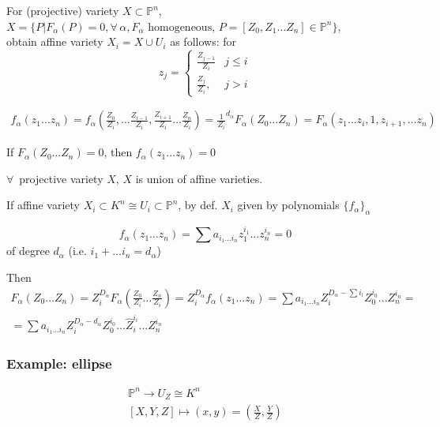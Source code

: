 \documentclass[10pt]{amsart}
\begin{document}
\begin{multicols*}{2}
For (projective) variety $X \subset \mathbb{P}^n$, $X = \lbrace P | F_{\alpha}(P) = 0, \forall \, \alpha, F_{\alpha} \text{ homogeneous, } P = [ Z_0 , Z_1 \dots Z_n] \in \mathbb{P}^n \rbrace$, \\
obtain affine variety $X_i = X \cup U_i$ as follows: for 
\[
z_j = \begin{cases} \frac{ Z_{j-1}}{ Z_i } & j \leq i \\ \frac{Z_j}{ Z_i} , & j > i \end{cases}
\]

\[
\begin{gathered}
f_{\alpha}(z_1 \dots z_n) = f_{\alpha}\left( \frac{Z_0}{Z_i} , \dots \frac{Z_{i-1}}{Z_i} , \frac{Z_{i+1}}{Z_i} \dots \frac{Z_n}{Z_i} \right) = \frac{1}{Z_i}^{d_{\alpha}} F_{\alpha}(Z_0 \dots Z_n) = F_{\alpha}(z_1 \dots z_i, 1, z_{i+1}, \dots z_n)
\end{gathered}
\]

If $F_{\alpha}(Z_0 \dots Z_n) = 0$, then $f_{\alpha}(z_1 \dots z_n) =0$

$\forall \, $ projective variety $X$, $X$ is union of affine varieties. 

If affine variety $X_i \subset K^n \cong U_i \subset \mathbb{P}^n$, by def. $X_i$ given by polynomials $\lbrace f_{\alpha} \rbrace_{\alpha}$

\[
f_{\alpha} (z_1 \dots z_n) = \sum a_{i_1 \dots i_n} z_1^{i_1} \dots z_n^{i_n} = 0
\]
of degree $d_{\alpha}$ (i.e. $i_1+ \dots i_n = d_{\alpha}$)

Then
\[
\begin{gathered}
F_{\alpha}(Z_0 \dots Z_n) = Z_i^{D_{\alpha}} F_{\alpha}\left( \frac{ Z_0}{Z_i} \dots \frac{Z_n}{Z_i} \right) = Z_i^{D_{\alpha}}f_{\alpha}(z_1 \dots z_n) = \sum a_{i_1 \dots i_n} Z_i^{D_{\alpha} - \sum i_l} Z_0^{i_0} \dots Z_n^{i_n} = \\
= \sum a_{i_1 \dots i_n} Z_i^{ D_{\alpha} - d_{\alpha}} Z_0^{i_0} \dots \widehat{Z}_i^{i_i} \dots Z_n^{i_n}
\end{gathered}\]

\subsubsection{Example: ellipse}

\begin{equation}
\begin{gathered}
\mathbb{P}^n \to U_Z \cong K^n \\
[X,Y,Z] \mapsto (x,y) = \left( \frac{X}{Z}, \frac{Y}{Z} \right) 
\end{gathered}
\end{equation}


\end{multicols*}
\end{document}
